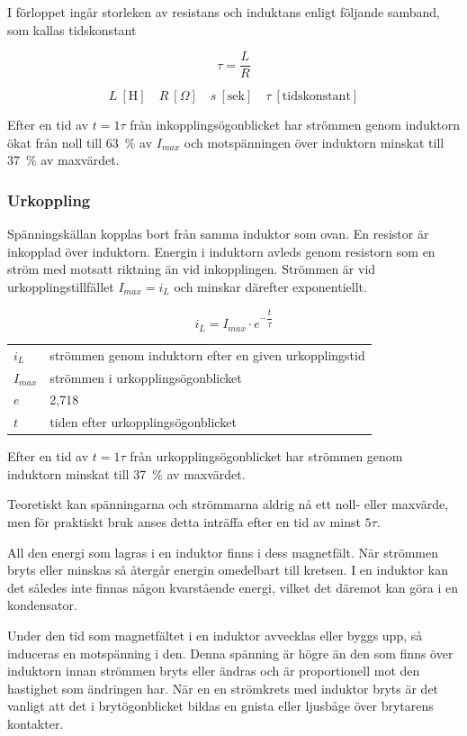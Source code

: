 I förloppet ingår storleken av resistans och induktans enligt följande samband,
som kallas tidskonstant

\[\tau = \frac{L}{R}\]

\[
L\ [\text{H}] \quad
R\ [\Omega] \quad
s\ [\text{sek}] \quad
\tau\ [\text{tidskonstant}]
\]

Efter en tid av \(t = 1\tau\) från inkopplingsögonblicket har strömmen genom
induktorn ökat från noll till 63~\% av \(I_{max}\) och motspänningen över
induktorn minskat till 37~\% av maxvärdet.

\subsubsection{Urkoppling}

Spänningskällan kopplas bort från samma induktor som ovan.
En resistor är inkopplad över induktorn.
Energin i induktorn avleds genom resistorn som en ström med motsatt riktning
än vid inkopplingen.
Strömmen är vid urkopplingstillfället \(I_{max} = i_L\) och minskar därefter
exponentiellt.

\[i_L = I_{max} \cdot e^{-\dfrac{t}{\tau}}\]

\begin{tabular}{ll}
  \(i_L\) & strömmen genom induktorn efter en given urkopplingstid \\
  \(I_{max}\) & strömmen i urkopplingsögonblicket \\
  \(e\) & 2,718 \\
  \(t\) & tiden efter urkopplingsögonblicket \\
\end{tabular}

Efter en tid av \(t = 1\tau\) från urkopplingsögonblicket har strömmen genom
induktorn minskat till 37~\% av maxvärdet.

Teoretiskt kan spänningarna och strömmarna aldrig nå ett noll- eller maxvärde,
men för praktiskt bruk anses detta inträffa efter en tid av minst \(5\tau\).

All den energi som lagras i en induktor finns i dess magnetfält.
När strömmen bryts eller minskas så återgår energin omedelbart till kretsen.
I en induktor kan det således inte finnas någon kvarstående energi, vilket
det däremot kan göra i en kondensator.

Under den tid som magnetfältet i en induktor avvecklas eller byggs upp, så
induceras en motspänning i den.
Denna spänning är högre än den som finns över induktorn innan strömmen bryts
eller ändras och är proportionell mot den hastighet som ändringen har.
När en en strömkrets med induktor bryts är det vanligt att det i
brytögonblicket bildas en gnista eller ljusbåge över brytarens kontakter.


